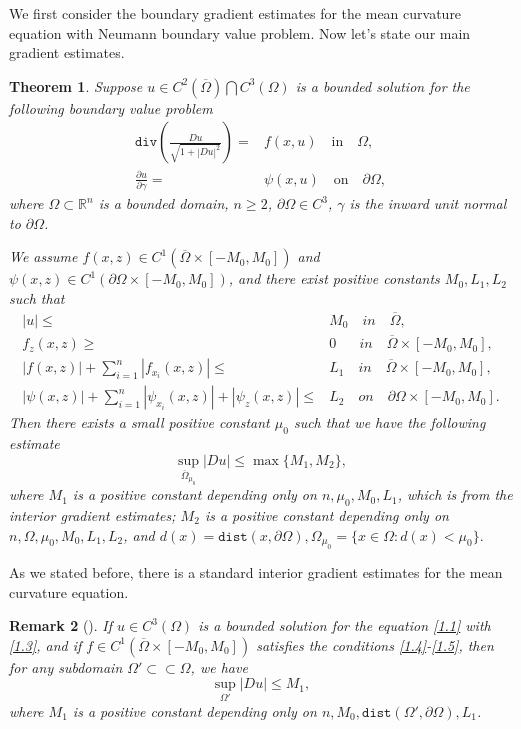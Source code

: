 \documentclass[11pt]{amsart}
\newtheorem{Thm}{Theorem}[section]
\newtheorem{Rem}[Thm]{Remark}
\numberwithin{equation}{section}
\begin{document}
We first consider the boundary gradient estimates for the mean curvature equation with Neumann boundary value problem.
Now let's state our main gradient estimates.
\begin{Thm}\label{Thm1.1}
Suppose $u\in C^{2}(\overline\Omega)\bigcap C^{3}(\Omega)$ is a bounded  solution for the following boundary value problem
\begin{align}
 \texttt{div}(\frac{Du}{\sqrt{1+|Du|^2}}) =&f(x, u)   \quad\text{in}\quad \Omega, \label{1.1}\\
              \frac{\partial u}{\partial \gamma} = &\psi(x, u)  \quad\text{on} \quad\partial \Omega,\label{1.2}
\end{align}
where $\Omega \subset \mathbb R^n $ is a bounded domain, $n\geq 2$, $\partial \Omega \in C^{3}$, $\gamma$ is the inward unit normal to $\partial\Omega $.

We assume $f(x,z) \in C^{1}(\overline\Omega\times [-M_0, M_0])$ and $\psi(x,z) \in C^{1}(\partial\Omega\times [-M_0, M_0])$,
and there exist positive constants $M_0, L_1, L_2$ such that
\begin{align}
|u|\leq& M_0\quad in\quad\overline\Omega,\label{1.3}\\
f_z(x,z)\geq &0 \,\,\,\,\quad in\quad \overline\Omega\times[-M_0, M_0],\label{1.4}\\
|f(x,z)|+\sum_{i=1}^n|f_{x_i}(x,z)|\leq & L_1 \quad in\quad \overline\Omega\times[-M_0, M_0],\label{1.5}\\
|\psi(x,z)|+\sum_{i=1}^n|\psi_{x_i}(x,z)|+|\psi_z(x,z)|\leq&  L_2\quad on \quad  \partial\Omega\times[-M_0, M_0].\label{1.6}
\end{align}
Then there exists a small positive constant
$\mu_0$ such that we have the following estimate
$$\sup_{\overline\Omega_{\mu_0}}|Du|\leq \max\{M_1, M_2\},$$
where $M_1$ is a positive constant depending only on $n, \mu_0, M_0, L_1$, which is from the interior gradient estimates;
$M_2$ is  a positive constant depending only on $n, \Omega, \mu_0, M_0, L_1, L_2$, and $d(x) =\texttt{dist}(x, \partial\Omega), \Omega_{\mu_0} = \{x \in \Omega : d(x)<\mu_0\}.$
\end{Thm}
 As we stated before, there is a standard interior gradient estimates for the mean curvature equation.

\begin{Rem}[\cite{GT01}]\label{Rem1.1}
If $u\in C^{3}(\Omega)$ is a bounded solution for the equation \eqref{1.1}  with \eqref{1.3}, and if $f \in C^{1}(\overline\Omega \times [-M_0, M_0])$ satisfies the conditions \eqref{1.4}-\eqref{1.5}, then for any subdomain
$\Omega'\subset\subset\Omega$, we have
$$\sup_{\Omega'}|Du|\leq M_1,$$
where $M_1$ is a positive constant depending only on $n,  M_0, \texttt{dist} (\Omega', \partial\Omega), L_1$.
\end{Rem}
\end{document}

